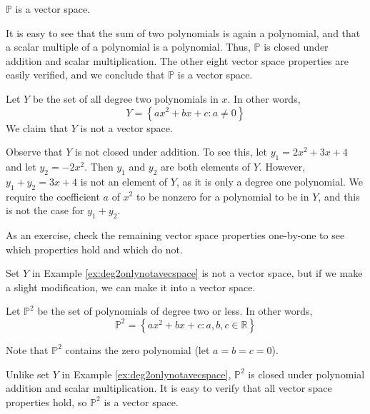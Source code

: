 \documentclass{ximera}
\begin{document}
\begin{example}\label{ex:pisavectorspace}
$\mathbb{P}$ is a vector space.  
\begin{explanation}It is easy to see that the sum of two polynomials is again a polynomial, and that a scalar multiple of a polynomial is a polynomial.  Thus, $\mathbb{P}$ is closed under addition and scalar multiplication.  The other eight vector space properties are easily verified, and we conclude that $\mathbb{P}$ is a vector space.
\end{explanation}
\end{example}
\begin{example}\label{ex:deg2onlynotavecspace}
Let $Y$ be the set of all degree two polynomials in $x$.  In other words,
$$Y=\left\{ax^2+bx+c : a \ne 0 \right\}$$
We claim that $Y$ is not a vector space.
\begin{explanation}
Observe that $Y$ is not closed under addition.  To see this, let $y_1 = 2x^2+3x+4$ and let $y_2=-2x^2$.  Then $y_1$ and $y_2$ are both elements of $Y$.  However, $y_1+y_2 = 3x+4$ is not an element of $Y$, as it is only a degree one polynomial.  We require the coefficient $a$ of $x^2$ to be nonzero for a polynomial to be in $Y$, and this is not the case for $y_1+y_2$.

As an exercise, check the remaining vector space properties one-by-one to see which properties hold and which do not.  
\end{explanation} %
\end{example}

Set $Y$ in Example \ref{ex:deg2onlynotavecspace} is not a vector space, but if we make a slight modification, we can make it into a vector space.  

\begin{example}\label{ex:deg_le_2vectorspace}
Let  $\mathbb{P}^2$ be the set of polynomials of degree two or less.  In other words,
$$\mathbb{P}^2=\left\{ax^2+bx+c : a,b,c \in \mathbb{R} \right\}$$

Note that $\mathbb{P}^2$ contains the zero polynomial (let $a=b=c=0$).  

Unlike set $Y$ in Example \ref{ex:deg2onlynotavecspace}, $\mathbb{P}^2$ is closed under polynomial addition and scalar multiplication.  It is easy to verify that all vector space properties hold, so $\mathbb{P}^2$ is a vector space.
\end{example}
\end{document}
